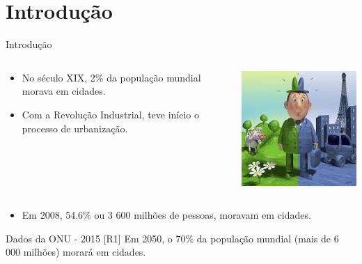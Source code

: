 \documentclass{beamer}
\begin{document}
\section{Introdução}
\begin{frame}{Introdução}

\begin{columns}
\begin{column}{0.6\textwidth}
\begin{itemize}
\item No século XIX, 2\% da população mundial morava em cidades. 

\item Com a Revolução Industrial, teve início o processo de
urbanização.
\end{itemize}
\end{column}
\begin{column}{0.4\textwidth}  %
    \includegraphics[width=.8\textwidth]{img/campo-city.jpeg}    
\end{column}
\end{columns}





\begin{itemize}

\item Em 2008, 54.6\% ou 3 600 milhões de pessoas, moravam em cidades.
\end{itemize}

\begin{exampleblock}{Dados da ONU - 2015 [R1]}
Em 2050, o 70\% da população mundial (mais de 6 000 milhões) morará
em cidades. 
 
\end{exampleblock}


\end{frame}
\end{document}
